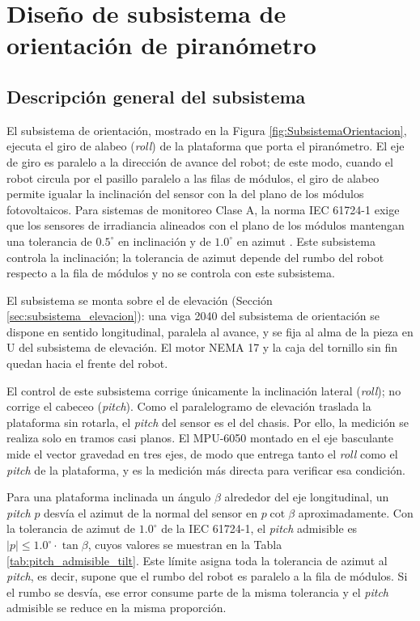 \documentclass[../../General.tex]{subfiles}
\begin{document}
\section{Diseño de subsistema de orientación de piranómetro}\label{sec:subsistema_orientacion}

\subsection{Descripción general del subsistema}

El subsistema de orientación, mostrado en la Figura \ref{fig:SubsistemaOrientacion}, ejecuta el giro de alabeo (\textit{roll}) de la plataforma que porta el piranómetro. El eje de giro es paralelo a la dirección de avance del robot; de este modo, cuando el robot circula por el pasillo paralelo a las filas de módulos, el giro de alabeo permite igualar la inclinación del sensor con la del plano de los módulos fotovoltaicos. Para sistemas de monitoreo Clase A, la norma IEC 61724-1 exige que los sensores de irradiancia alineados con el plano de los módulos mantengan una tolerancia de $0.5^\circ$ en inclinación y de $1.0^\circ$ en azimut \citep{IEC61724-1_2021}. Este subsistema controla la inclinación; la tolerancia de azimut depende del rumbo del robot respecto a la fila de módulos y no se controla con este subsistema.

El subsistema se monta sobre el de elevación (Sección \ref{sec:subsistema_elevacion}): una viga 2040 del subsistema de orientación se dispone en sentido longitudinal, paralela al avance, y se fija al alma de la pieza en U del subsistema de elevación. El motor NEMA 17 y la caja del tornillo sin fin quedan hacia el frente del robot.

El control de este subsistema corrige únicamente la inclinación lateral (\textit{roll}); no corrige el cabeceo (\textit{pitch}). Como el paralelogramo de elevación traslada la plataforma sin rotarla, el \textit{pitch} del sensor es el del chasis. Por ello, la medición se realiza solo en tramos casi planos. El MPU-6050 montado en el eje basculante mide el vector gravedad en tres ejes, de modo que entrega tanto el \textit{roll} como el \textit{pitch} de la plataforma, y es la medición más directa para verificar esa condición.

Para una plataforma inclinada un ángulo $\beta$ alrededor del eje longitudinal, un \textit{pitch} $p$ desvía el azimut de la normal del sensor en $p \cot\beta$ aproximadamente. Con la tolerancia de azimut de $1.0^\circ$ de la IEC 61724-1, el \textit{pitch} admisible es $|p| \leq 1.0^\circ \cdot \tan\beta$, cuyos valores se muestran en la Tabla \ref{tab:pitch_admisible_tilt}. Este límite asigna toda la tolerancia de azimut al \textit{pitch}, es decir, supone que el rumbo del robot es paralelo a la fila de módulos. Si el rumbo se desvía, ese error consume parte de la misma tolerancia y el \textit{pitch} admisible se reduce en la misma proporción.
\end{document}
